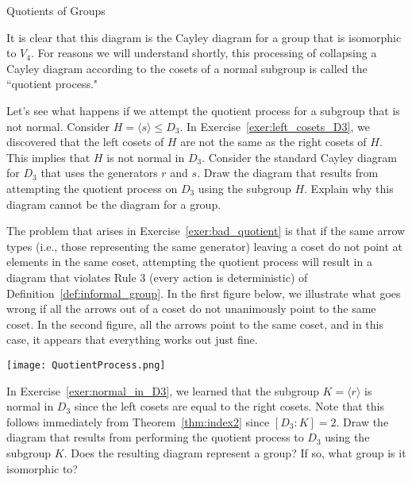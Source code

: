 \begin{section}{Quotients of Groups}
\begin{center}
\end{center}
It is clear that this diagram is the Cayley diagram for a group that is isomorphic to \(V_4\).  For reasons we will understand shortly, this processing of collapsing a Cayley diagram according to the cosets of a normal subgroup is called the ``quotient process."

\begin{exercise}\label{exer:bad_quotient}
Let's see what happens if we attempt the quotient process for a subgroup that is not normal.  Consider \(H=\langle s\rangle \leq D_3\).  In Exercise~\ref{exer:left_cosets_D3}, we discovered that the left cosets of \(H\) are not the same as the right cosets of \(H\).  This implies that \(H\) is not normal in \(D_3\).  Consider the standard Cayley diagram for \(D_3\) that uses the generators \(r\) and \(s\).  Draw the diagram that results from attempting the quotient process on \(D_3\) using the subgroup \(H\).  Explain why this diagram cannot be the diagram for a group.
\end{exercise}

The problem that arises in Exercise~\ref{exer:bad_quotient} is that if the same arrow types (i.e., those representing the same generator) leaving a coset do not point at elements in the same coset, attempting the quotient process will result in a diagram that violates Rule 3 (every action is deterministic) of Definition~\ref{def:informal_group}.  In the first figure below, we illustrate what goes wrong if all the arrows out of a coset do not unanimously point to the same coset.  In the second figure, all the arrows point to the same coset, and in this case, it appears that everything works out just fine.

\begin{center}
\texttt{[image: QuotientProcess.png]}
\end{center}

\begin{exercise}
In Exercise~\ref{exer:normal_in_D3}, we learned that the subgroup \(K=\langle r\rangle\) is normal in \(D_3\) since the left cosets are equal to the right cosets.  Note that this follows immediately from Theorem~\ref{thm:index2} since \([D_3:K]=2\).  Draw the diagram that results from performing the quotient process to \(D_3\) using the subgroup \(K\).  Does the resulting diagram represent a group?  If so, what group is it isomorphic to?
\end{exercise}


\end{section}
